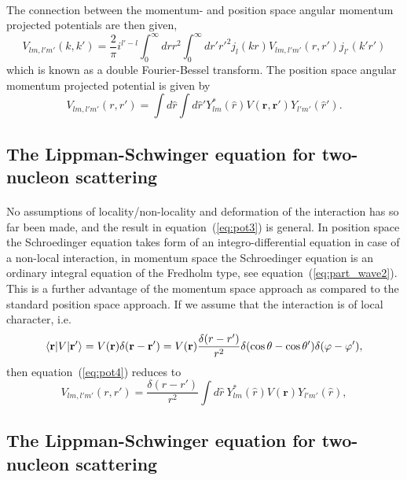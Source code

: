 \documentclass[%
twoside,                 %
final,                   %
10pt]{article}
\begin{document}
\paragraph{}
The connection between the momentum- and position space angular momentum 
projected potentials are then given, 
\[
  V_{lm, l'm'}(k,k')=\frac{2}{\pi}i^{l'-l}\int_0^\infty drr^2 \int_0^\infty dr'{r'}^2j_l(kr) V_{lm,l'm'}(r,r') j_{l'}(k'r')
  \label{eq:pot3}
\]
which is known as a double Fourier-Bessel transform. The position space angular 
momentum projected potential is given by
\[
  V_{lm, l'm'}(r,r') = \int d{\hat{r}} \int d{\hat{r}'}Y_{lm}^*(\hat{r})V(\mathbf{r}, \mathbf{r'})Y_{l'm'}(\hat{r}').
  \label{eq:pot4}
\]



\subsection*{The Lippman-Schwinger equation for two-nucleon scattering}

\paragraph{}
No assumptions of locality/non-locality and deformation of the interaction has so far been made, 
and the result in equation~(\ref{eq:pot3}) is general. In position space the Schroedinger equation 
takes form of an integro-differential equation in case of a non-local interaction, 
in momentum space the Schroedinger equation is an ordinary integral equation of the Fredholm type, 
see equation~(\ref{eq:part_wave2}). This is a further advantage of the momentum space approach as compared to 
the standard position space approach.  
If we assume that the 
interaction is of local character, i.e. 
\[
  \langle \mathbf{r}\vert V \vert \mathbf{r'}\rangle = V(\mathbf{r}) \delta( \mathbf{r}-\mathbf{r}' ) = 
  V(\mathbf{r}) {\delta( { r}-{r}' ) \over r^2} \delta ( \cos \theta - \cos \theta' ) \delta (\varphi-\varphi'), 
\]
then equation~(\ref{eq:pot4}) reduces to 
\begin{equation}
  V_{lm, l'm'}(r,r') = \frac{\delta({r}-{r}')}{r^2}\int d{\hat{r}}\:
  Y_{lm}^*(\hat{r})V(\mathbf{r})Y_{l'm'}(\hat{r}),
  \label{eq:pot5}
\end{equation}



\subsection*{The Lippman-Schwinger equation for two-nucleon scattering}
\end{document}
